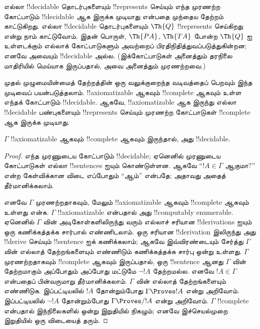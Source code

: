 \documentclass[../../../include/open-logic-section]{subfiles}
\begin{document}
\begin{explain}
எல்லா !!{decidable} தொடர்புகளையும் !!{represents} செய்யும் எந்த முரணற்ற
கோட்பாடும் !!{decidable} ஆக இருக்க முடியாது என்பதை முந்தைய தேற்றம்
காட்டுகிறது. எல்லா !!{decidable} தொடர்புகளையும் $\Th{Q}$
!!{represents} செய்கிறது என்று நாம் காட்டுவோம். இதன் பொருள், $\Th{PA}$,
$\Th{TA}$ போன்ற $\Th{Q}$ ஐ உள்ளடக்கும் எல்லாக் கோட்பாடுகளும் அவற்றைப்
பிரதிநிதித்துவப்படுத்துகின்றன; எனவே அவையும் !!{decidable} அல்ல. (இக்கோட்பாடுகள்
அனைத்தும் தரநிலை மாதிரியில் மெய்யாக இருப்பதால், அவை அனைத்தும் முரணற்றவை.)

முதல் முழுமையின்மைத் தேற்றத்தின் ஒரு வலுக்குறைந்த வடிவத்தைப் பெறவும் இந்த
முடிவைப் பயன்படுத்தலாம். !!{axiomatizable} ஆகவும் !!{complete} ஆகவும்
உள்ள எந்தக் கோட்பாடும் !!{decidable}. ஆகவே, !!{axiomatizable} ஆக இருந்து
எல்லா !!{decidable} பண்புகளையும் !!{represents} செய்யும் முரணற்ற
கோட்பாடுகள் !!{complete} ஆக இருக்க முடியாது.
\end{explain}

\begin{thm}
$\Gamma$ !!{axiomatizable} ஆகவும் !!{complete} ஆகவும் இருந்தால், அது
!!{decidable}.
\end{thm}

\begin{proof}
எந்த முரணுடைய கோட்பாடும் !!{decidable}; ஏனெனில் முரணுடைய கோட்பாடுகள் எல்லா
!!{sentence}s ஐயும் கொண்டுள்ளன. ஆகவே ``$!A \in \Gamma$ ஆகுமா?'' என்ற
கேள்விக்கான விடை எப்போதும் ``ஆம்'' என்பதே; அதாவது அதைத் தீர்மானிக்கலாம்.

எனவே $\Gamma$ முரணற்றதாகவும், மேலும் !!{axiomatizable} ஆகவும்
!!{complete} ஆகவும் உள்ளது என்க. $\Gamma$ !!{axiomatizable} என்பதால் அது
!!{computably enumerable}. ஏனெனில் $\Gamma$ வின் அடிகோள்களிலிருந்து வரும்
எல்லாச் சரியான !!{derivation}s ஐயும் ஒரு கணிக்கத்தக்க சார்பால் எண்ணிடலாம்.
ஒரு சரியான !!{derivation} இலிருந்து அது !!{derive} செய்யும் !!{sentence}
ஐக் கணிக்கலாம்; ஆகவே இவ்விரண்டையும் சேர்த்து $\Gamma$ வின் எல்லாத்
தேற்றங்களையும் எண்ணிடும் கணிக்கத்தக்க சார்பு ஒன்று உள்ளது. $\Gamma$
முரணற்றதாகவும் !!{complete} ஆகவும் இருப்பதால், ஒரு !!{sentence} ஆனது
$\Gamma$ வின் தேற்றமாகும்
அப்போதும் அப்போது மட்டுமே $\lnot !A$ தேற்றமல்ல. எனவே $!A \in \Gamma$
என்பதைப் பின்வருமாறு தீர்மானிக்கலாம். $\Gamma$ வின் எல்லாத் தேற்றங்களையும்
எண்ணிடுக. இப்பட்டியலில் $!A$ தோன்றும்போது $\Gamma \Proves !A$ என்று
அறிவோம். இப்பட்டியலில் $\lnot !A$ தோன்றும்போது $\Gamma \Proves/ !A$
என்று அறிவோம். $\Gamma$ !!{complete} என்பதால் இந்நிலைகளில் ஒன்று இறுதியில்
நிகழும்; எனவே இச்செயல்முறை இறுதியில் ஒரு விடையைத் தரும்.
\end{proof}
\end{document}
